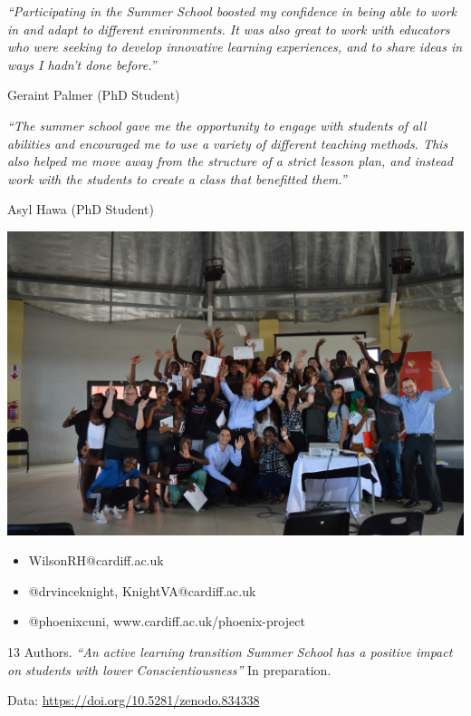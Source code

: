 \documentclass{beamer}
\begin{document}
    \begin{frame}
        \textit{``Participating in the Summer School boosted my confidence in being
            able to work in and adapt to different environments. It was also great
            to work with educators who were seeking to develop innovative learning
        experiences, and to share ideas in ways I hadn't done before.''}
        \begin{flushright} 
            Geraint Palmer (PhD Student)
        \end{flushright}

        \vfill

        \textit{``The summer school gave me the opportunity to engage with students
            of all abilities and encouraged me to use a variety of different
            teaching methods. This also helped me move away from the structure of a
            strict lesson plan, and instead work with the students to create a class
        that benefitted them.''} 
        \begin{flushright}
            Asyl Hawa (PhD Student)
        \end{flushright}
    \end{frame}

    \begin{frame}
        \begin{center}
            \includegraphics[width=.9\textwidth]{./assets/group_photo.jpg}
        \end{center}
    \end{frame}


    \begin{frame}

        \begin{itemize}
            \item WilsonRH@cardiff.ac.uk
            \item @drvinceknight, KnightVA@cardiff.ac.uk
            \item @phoenixcuni, www.cardiff.ac.uk/phoenix-project
        \end{itemize}

        \vfill

        13 Authors. \textit{``An active learning transition Summer School has a positive
        impact on students with lower
    Conscientiousness''} In preparation.

    \vfill

    Data: \url{https://doi.org/10.5281/zenodo.834338}
\end{frame}
\end{document}
